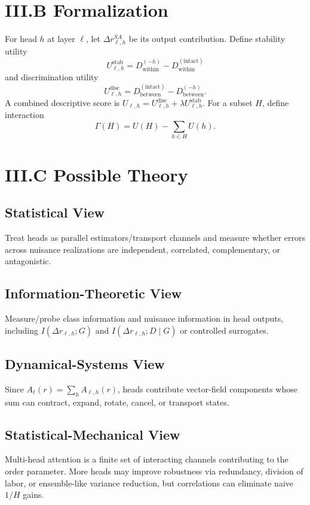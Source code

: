 \documentclass[10pt]{article}
\begin{document}
\section{III.B Formalization}
For head $h$ at layer $\ell$, let $\Delta r_{\ell,h}^{SA}$ be its output contribution. Define stability utility
\begin{equation}U^{\mathrm{stab}}_{\ell,h}=D_{\mathrm{within}}^{(-h)}-D_{\mathrm{within}}^{(\mathrm{intact})}\end{equation}
and discrimination utility
\begin{equation}U^{\mathrm{disc}}_{\ell,h}=D_{\mathrm{between}}^{(\mathrm{intact})}-D_{\mathrm{between}}^{(-h)}.\end{equation}
A combined descriptive score is $U_{\ell,h}=U^{\mathrm{disc}}_{\ell,h}+\lambda U^{\mathrm{stab}}_{\ell,h}$. For a subset $H$, define interaction
\begin{equation}\Gamma(H)=U(H)-\sum_{h\in H}U(h).\end{equation}

\section{III.C Possible Theory}
\subsection{Statistical View} Treat heads as parallel estimators/transport channels and measure whether errors across nuisance realizations are independent, correlated, complementary, or antagonistic.
\subsection{Information-Theoretic View} Measure/probe class information and nuisance information in head outputs, including $I(\Delta r_{\ell,h};G)$ and $I(\Delta r_{\ell,h};D\mid G)$ or controlled surrogates.
\subsection{Dynamical-Systems View} Since $A_\ell(r)=\sum_h A_{\ell,h}(r)$, heads contribute vector-field components whose sum can contract, expand, rotate, cancel, or transport states.
\subsection{Statistical-Mechanical View} Multi-head attention is a finite set of interacting channels contributing to the order parameter. More heads may improve robustness via redundancy, division of labor, or ensemble-like variance reduction, but correlations can eliminate naive $1/H$ gains.
\end{document}
